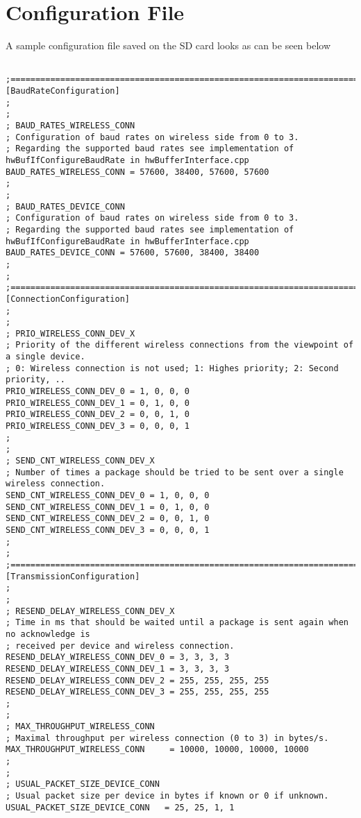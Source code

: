 %
\chapter{Configuration File} \label{app:txtConfigFile}%
%
A sample configuration file saved on the SD card looks as can be seen below
\begin{lstlisting}

;========================================================================================
[BaudRateConfiguration]
;
;
; BAUD_RATES_WIRELESS_CONN
; Configuration of baud rates on wireless side from 0 to 3.
; Regarding the supported baud rates see implementation of hwBufIfConfigureBaudRate in hwBufferInterface.cpp
BAUD_RATES_WIRELESS_CONN = 57600, 38400, 57600, 57600
;
;
; BAUD_RATES_DEVICE_CONN
; Configuration of baud rates on wireless side from 0 to 3.
; Regarding the supported baud rates see implementation of hwBufIfConfigureBaudRate in hwBufferInterface.cpp
BAUD_RATES_DEVICE_CONN = 57600, 57600, 38400, 38400
;
;
;========================================================================================
[ConnectionConfiguration]
;
;
; PRIO_WIRELESS_CONN_DEV_X
; Priority of the different wireless connections from the viewpoint of a single device.
; 0: Wireless connection is not used; 1: Highes priority; 2: Second priority, ..
PRIO_WIRELESS_CONN_DEV_0 = 1, 0, 0, 0
PRIO_WIRELESS_CONN_DEV_1 = 0, 1, 0, 0
PRIO_WIRELESS_CONN_DEV_2 = 0, 0, 1, 0
PRIO_WIRELESS_CONN_DEV_3 = 0, 0, 0, 1
;
;
; SEND_CNT_WIRELESS_CONN_DEV_X
; Number of times a package should be tried to be sent over a single wireless connection.
SEND_CNT_WIRELESS_CONN_DEV_0 = 1, 0, 0, 0
SEND_CNT_WIRELESS_CONN_DEV_1 = 0, 1, 0, 0
SEND_CNT_WIRELESS_CONN_DEV_2 = 0, 0, 1, 0
SEND_CNT_WIRELESS_CONN_DEV_3 = 0, 0, 0, 1
;
;
;========================================================================================
[TransmissionConfiguration]
;
;
; RESEND_DELAY_WIRELESS_CONN_DEV_X
; Time in ms that should be waited until a package is sent again when no acknowledge is 
; received per device and wireless connection.
RESEND_DELAY_WIRELESS_CONN_DEV_0 = 3, 3, 3, 3
RESEND_DELAY_WIRELESS_CONN_DEV_1 = 3, 3, 3, 3
RESEND_DELAY_WIRELESS_CONN_DEV_2 = 255, 255, 255, 255
RESEND_DELAY_WIRELESS_CONN_DEV_3 = 255, 255, 255, 255
;
;
; MAX_THROUGHPUT_WIRELESS_CONN
; Maximal throughput per wireless connection (0 to 3) in bytes/s.
MAX_THROUGHPUT_WIRELESS_CONN	 = 10000, 10000, 10000, 10000
;
;
; USUAL_PACKET_SIZE_DEVICE_CONN
; Usual packet size per device in bytes if known or 0 if unknown.
USUAL_PACKET_SIZE_DEVICE_CONN	= 25, 25, 1, 1

\end{lstlisting}
